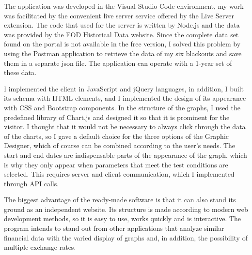 	The application was developed in the Visual Studio Code environment, my work was facilitated by the convenient live server service offered by the Live Server extension. The code that used for the server is written by Node.js and the data was provided by the EOD Historical Data website. 
Since the complete data set found on the portal is not available in the free version, I solved this problem by using the Postman application to retrieve the data of my six blackouts and save them in a separate json file. The application can operate with a 1-year set of these data.

	I implemented the client in JavaScript and jQuery languages, in addition, I built its schema with HTML elements, and I implemented the design of its appearance with CSS and Bootstrap components. In the structure of the graphs, I used the predefined library of Chart.js and designed it so that it is prominent for the visitor. I thought that it would not be necessary to always click through the data of the charts, so I gave a default choice for the three options of the Graphic Designer, which of course can be combined according to the user's needs. The start and end dates are indispensable parts of the appearance of the graph, which is why they only appear when parameters that meet the test conditions are selected. This requires server and client communication, which I implemented through API calls.

	The biggest advantage of the ready-made software is that it can also stand its ground as an independent website. Its structure is made according to modern web development methods, so it is easy to use, works quickly and is interactive. The program intends to stand out from other applications that analyze similar financial data with the varied display of graphs and, in addition, the possibility of multiple exchange rates.
